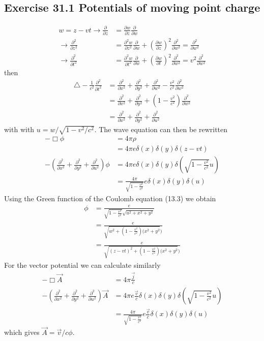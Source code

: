 \documentclass[10pt,a4paper]{book}
\theoremstyle{definition}
\begin{document}
\subsection{Exercise 31.1 Potentials of moving point charge}
\begin{align}
    w=z-vt
    \rightarrow
    \frac{\partial}{\partial z}&=\frac{\partial w}{\partial z}\frac{\partial}{\partial w}\\
    \rightarrow\frac{\partial^2}{\partial z^2}&=\frac{\partial^2 w}{\partial z^2}\frac{\partial}{\partial w}+\left(\frac{\partial w}{\partial z}\right)^2\frac{\partial^2}{\partial w^2}=\frac{\partial^2}{\partial w^2}\\
    \rightarrow\frac{\partial^2}{\partial t^2}&=\frac{\partial^2 w}{\partial t^2}\frac{\partial}{\partial w}+\left(\frac{\partial w}{\partial t}\right)^2\frac{\partial^2}{\partial w^2}=v^2\frac{\partial^2}{\partial w^2}
\end{align}
then
\begin{align}
    \triangle-\frac{1}{c^2}\frac{\partial^2}{\partial t^2}&=\frac{\partial^2}{\partial x^2}+\frac{\partial^2}{\partial y^2}+\frac{\partial^2}{\partial w^2}-\frac{v^2}{c^2}\frac{\partial^2}{\partial w^2}\\
    &=\frac{\partial^2}{\partial x^2}+\frac{\partial^2}{\partial y^2}+\left(1-\frac{v^2}{c^2}\right)\frac{\partial^2}{\partial w^2}\\
    &=\frac{\partial^2}{\partial x^2}+\frac{\partial^2}{\partial y^2}+\frac{\partial^2}{\partial u^2}
\end{align}
with with $u=w/\sqrt{1-v^2/c^2}$. The wave equation can then be rewritten
\begin{align}
    -\Box\phi&=4\pi\rho\\
    &=4\pi e\delta(x)\delta(y)\delta(z-vt)\\
    -\left(\frac{\partial^2}{\partial x^2}+\frac{\partial^2}{\partial y^2}+\frac{\partial^2}{\partial u^2}\right)\phi&=4\pi e\delta(x)\delta(y)\delta\left(\sqrt{1-\frac{v^2}{c^2}}u\right)\\
    &=\frac{4\pi}{\sqrt{1-\frac{v^2}{c^2}}} e\delta(x)\delta(y)\delta\left(u\right)
\end{align}
Using the Green function of the Coulomb equation (13.3) we obtain
\begin{align}
    \phi&=\frac{e}{\sqrt{1-\frac{v^2}{c^2}}\sqrt{u^2+x^2+y^2}}\\
    &=\frac{e}{\sqrt{w^2+(1-\frac{v^2}{c^2})(x^2+y^2})}\\
    &=\frac{e}{\sqrt{(z-vt)^2+(1-\frac{v^2}{c^2})(x^2+y^2})}
\end{align}
For the vector potential we can calculate similarly
\begin{align}
    -\Box\vec{A}&=4\pi\frac{\vec{j}}{c}\\
    -\left(\frac{\partial^2}{\partial x^2}+\frac{\partial^2}{\partial y^2}+\frac{\partial^2}{\partial u^2}\right)\vec{A}&=4\pi e\frac{\vec{v}}{c}\delta(x)\delta(y)\delta\left(\sqrt{1-\frac{v^2}{c^2}}u\right)\\
    &=\frac{4\pi}{\sqrt{1-\frac{v^2}{c^2}}} e\frac{\vec{v}}{c}\delta(x)\delta(y)\delta\left(u\right)
\end{align}
which gives $\vec{A}=\vec{v}/c\phi$.
\end{document}
